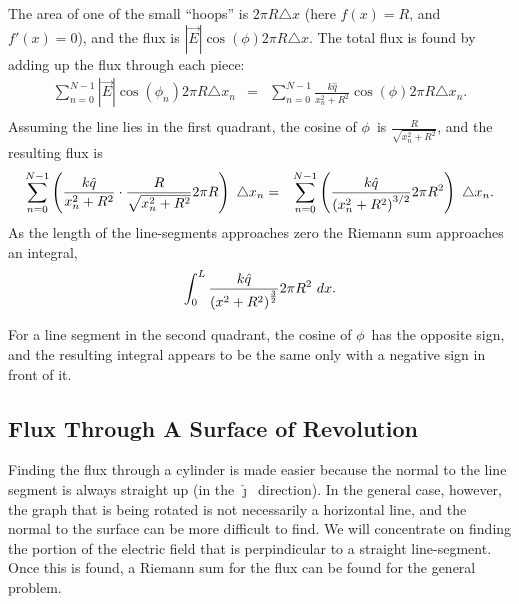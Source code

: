 The area of one of the small ``hoops'' is $2\pi R \triangle x$ (here
$f(x)=R$, and $f'(x)=0$), and the flux is $|\vec{E}|\cos(\phi) 2\pi R
\triangle x$. The total flux is found by adding up the flux through
each piece:
\begin{eqnarray*}
  \sum^{N-1}_{n=0} |\vec{E}|\cos(\phi_n) 2\pi R \triangle x_n & = &
  \sum^{N-1}_{n=0} \frac{k\hat{q}}{x_n^2+R^2} \cos(\phi)
      2\pi R \triangle x_n.\\
\end{eqnarray*}
Assuming the line lies in the first quadrant, the cosine of $\phi$\ is
$\frac{R}{\sqrt{x_n^2+R^2}}$, and the resulting flux is
\begin{eqnarray*}
\sum^{N-1}_{n=0} \left( \frac{k\hat{q}}{x_n^2+R^2} \cdot
                     \frac{R}{\sqrt{x_n^2+R^2}}
      2\pi R \right) ~ \triangle x_n
  & = & \sum^{N-1}_{n=0} \left( \frac{k\hat{q}}{\left( x_n^2+R^2 \right)^{3/2}}
      2\pi R^2 \right) ~ \triangle x_n.
\end{eqnarray*}
As the length of the line-segments approaches zero the Riemann sum
approaches an integral,
\begin{eqnarray*}
  \int^L_{0} \frac{k\hat{q}}{\left({x^2+R^2}\right)^{\frac{3}{2}}}
      2\pi R^2 ~dx.
\end{eqnarray*}

For a line segment in the second quadrant, the cosine of $\phi$\ has
the opposite sign, and the resulting integral appears to be the same
only with a negative sign in front of it.


\subsection{Flux Through A Surface of Revolution}
Finding the flux through a cylinder is made easier because the normal
to the line segment is always straight up (in the $\hat{\jmath}$\
direction). In the general case, however, the graph that is being
rotated is not necessarily a horizontal line, and the normal to the
surface can be more difficult to find. We will concentrate on finding
the portion of the electric field that is perpindicular to a straight
line-segment. Once this is found, a Riemann sum for the flux can be
found for the general problem.

